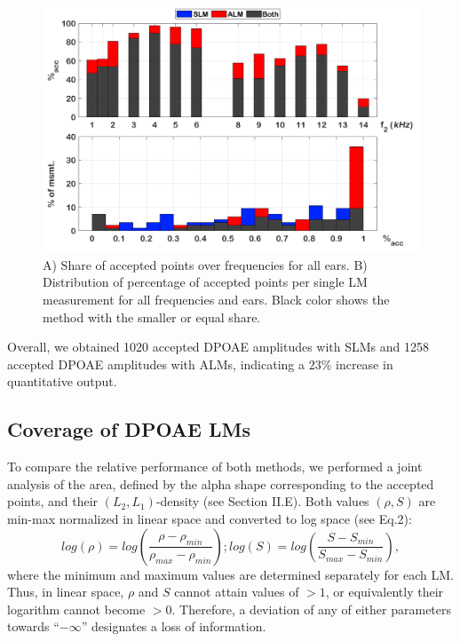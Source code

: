 \documentclass[journal,twoside,web]{ieeecolor2}
\begin{document}
\begin{figure}[ht]
\centerline{\includegraphics[width=\columnwidth]{Fig_Efficiency_v3.png}}
\caption{A) Share of accepted points over frequencies for all ears.
B) Distribution of percentage of accepted points per single LM measurement for all frequencies and ears.
Black color shows the method with the smaller or equal share.}
\label{fig_EFF}
\end{figure}

Overall, we obtained 1020 accepted DPOAE amplitudes with SLMs and 1258 accepted DPOAE amplitudes with ALMs, indicating a $23\%$ increase in quantitative output.

\subsection{Coverage of DPOAE LMs}
To compare the relative performance of both methods, we performed a joint analysis of the area, defined by the alpha shape corresponding to the accepted points, and their $(L_2, L_1)$-density (see Section II.E).
Both values $(\rho, S)$ are min-max normalized in linear space and converted to log space (see Eq.2):
\begin{equation} log(\rho) = log(\frac{\rho - \rho_{min}}{\rho_{max} - \rho_{min}}); log(S) = log(\frac{S - S_{min}}{S_{max} - S_{min}}), \label{eq2}\end{equation}
where the minimum and maximum values are determined separately for each LM.
Thus, in linear space, $\rho$ and $S$ cannot attain values of $> 1$, or equivalently their logarithm cannot become $> 0$.
Therefore, a deviation of any of either parameters towards “$-\infty$” designates a loss of information.
\end{document}
